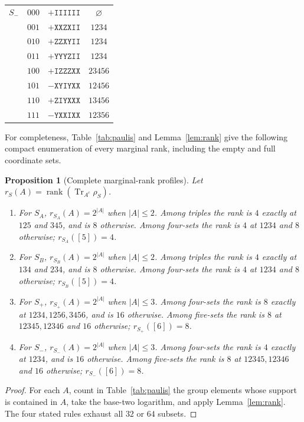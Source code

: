 \documentclass[11pt]{article}
\newtheorem{proposition}{Proposition}
\DeclareMathOperator{\rank}{rank}
\DeclareMathOperator{\Tr}{Tr}
\begin{document}
\begin{longtable}{@{}cllc@{}}
$S_-$ & $000$ & $+\mathtt{IIIIII}$ & $\varnothing$\\
      & $001$ & $+\mathtt{XXZXII}$ & $1234$\\
      & $010$ & $+\mathtt{ZZXYII}$ & $1234$\\
      & $011$ & $+\mathtt{YYYZII}$ & $1234$\\
      & $100$ & $+\mathtt{IZZZXX}$ & $23456$\\
      & $101$ & $-\mathtt{XYIYXX}$ & $12456$\\
      & $110$ & $+\mathtt{ZIYXXX}$ & $13456$\\
      & $111$ & $-\mathtt{YXXIXX}$ & $12356$\\
\end{longtable}

\newpage
For completeness, Table~\ref{tab:paulis} and Lemma~\ref{lem:rank} give the
following compact enumeration of every marginal rank, including the empty
and full coordinate sets.

\begin{proposition}[Complete marginal-rank profiles]\label{prop:profiles}
Let $r_S(A)=\rank(\Tr_{A^c}\rho_S)$.
\begin{enumerate}
\item For $S_A$, $r_{S_A}(A)=2^{|A|}$ when $|A|\leq2$.
Among triples the rank is $4$ exactly at $125$ and $345$, and is $8$
otherwise.  Among four-sets the rank is $4$ at $1234$ and $8$ otherwise;
$r_{S_A}([5])=4$.
\item For $S_B$, $r_{S_B}(A)=2^{|A|}$ when $|A|\leq2$.
Among triples the rank is $4$ exactly at $134$ and $234$, and is $8$
otherwise.  Among four-sets the rank is $4$ at $1234$ and $8$ otherwise;
$r_{S_B}([5])=4$.
\item For $S_+$, $r_{S_+}(A)=2^{|A|}$ when $|A|\leq3$.
Among four-sets the rank is $8$ exactly at $1234,1256,3456$, and is $16$
otherwise.  Among five-sets the rank is $8$ at $12345,12346$ and $16$
otherwise; $r_{S_+}([6])=8$.
\item For $S_-$, $r_{S_-}(A)=2^{|A|}$ when $|A|\leq3$.
Among four-sets the rank is $4$ exactly at $1234$, and is $16$ otherwise.
Among five-sets the rank is $8$ at $12345,12346$ and $16$ otherwise;
$r_{S_-}([6])=8$.
\end{enumerate}
\end{proposition}

\begin{proof}
For each $A$, count in Table~\ref{tab:paulis} the group elements whose
support is contained in $A$, take the base-two logarithm, and apply
Lemma~\ref{lem:rank}.  The four stated rules exhaust all $32$ or $64$
subsets.
\end{proof}
\end{document}

